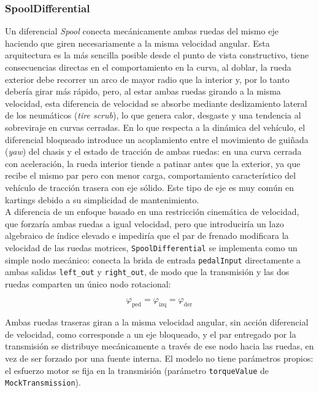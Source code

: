 \subsubsection*{SpoolDifferential}

Un diferencial \textit{Spool} conecta mecánicamente ambas ruedas del mismo eje haciendo que giren necesariamente a la misma velocidad angular. Esta arquitectura es la más sencilla posible desde el punto de vista constructivo, tiene consecuencias directas en el comportamiento en la curva, al doblar, la rueda exterior debe recorrer un arco de mayor radio que la interior y, por lo tanto debería girar más rápido, pero, al estar ambas ruedas girando a la misma velocidad, esta diferencia de velocidad se absorbe mediante deslizamiento lateral de los neumáticos (\textit{tire scrub}), lo que genera calor, desgaste y una tendencia al sobreviraje en curvas cerradas. En lo que respecta a la dinámica del vehículo, el diferencial bloqueado introduce un acoplamiento entre el movimiento de guiñada (\textit{yaw}) del chasis y el estado de tracción de ambas ruedas: en una curva cerrada con aceleración, la rueda interior tiende a patinar antes que la exterior, ya que recibe el mismo par pero con menor carga, comportamiento característico del vehículo de tracción trasera con eje sólido. Este tipo de eje es muy común en kartings debido a su simplicidad de mantenimiento. \\

A diferencia de un enfoque basado en una restricción cinemática de velocidad, que forzaría ambas ruedas a igual velocidad, pero que introduciría un lazo algebraico de índice elevado e impediría que el par de frenado modificara la velocidad de las ruedas motrices, \verb|SpoolDifferential| se implementa como un simple nodo mecánico: conecta la brida de entrada \verb|pedalInput| directamente a ambas salidas \verb|left_out| y \verb|right_out|, de modo que la transmisión y las dos ruedas comparten un único nodo rotacional:

\begin{equation}
    \varphi_\text{ped} = \varphi_\text{izq} = \varphi_\text{der}
\end{equation}

Ambas ruedas traseras giran a la misma velocidad angular, sin acción diferencial de velocidad, como corresponde a un eje bloqueado, y el par entregado por la transmisión se distribuye mecánicamente a través de ese nodo hacia las ruedas, en vez de ser forzado por una fuente interna. El modelo no tiene parámetros propios: el esfuerzo motor se fija en la transmisión (parámetro \verb|torqueValue| de \verb|MockTransmission|).\\

